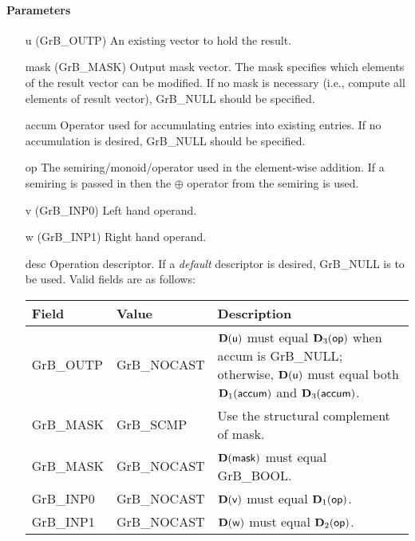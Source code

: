 \paragraph{Parameters}

\begin{itemize}[leftmargin=1.1in]
    \item[{\sf u}]     ({\sf GrB\_OUTP}) An existing vector to hold the result.

    \item[{\sf mask}] ({\sf GrB\_MASK}) Output mask vector. The mask
    specifies which elements of the result vector can be modified.
    If no mask is necessary (i.e., compute all elements of result
    vector), {\sf GrB\_NULL} should be specified.

    \item[{\sf accum}]  Operator used for accumulating entries into existing
                         entries. If no accumulation is desired,
                        {\sf GrB\_NULL} should be specified.

    \item[{\sf op}]    The semiring/monoid/operator used in the element-wise addition.
                       If a semiring is passed in then the $\oplus$  operator from
                                    the semiring is used.
    \item[{\sf v}]     ({\sf GrB\_INP0}) Left hand operand.
    \item[{\sf w}]     ({\sf GrB\_INP1}) Right hand operand.

    \item[{\sf desc}]  Operation descriptor. If a
    \emph{default} descriptor is desired, {\sf GrB\_NULL} is to be
    used. Valid fields are as follows: \\
    \begin{tabular}{llp{3in}}
        Field  & Value & Description \\
        \hline
        {\sf GrB\_OUTP} & {\sf GrB\_NOCAST} & $\bold{D}({\sf u})$ must equal $\bold{D}_3({\sf op})$
                                              when {\sf accum} is {\sf GrB\_NULL}; otherwise, 
                                              $\bold{D}({\sf u})$ must equal both 
                                              $\bold{D}_1({\sf accum})$ and $\bold{D}_3({\sf accum})$. \\
        {\sf GrB\_MASK} & {\sf GrB\_SCMP}   & Use the structural complement of {\sf mask}. \\
        {\sf GrB\_MASK} & {\sf GrB\_NOCAST} & $\bold{D}({\sf mask})$ must equal {\sf GrB\_BOOL}. \\
        {\sf GrB\_INP0} & {\sf GrB\_NOCAST} & $\bold{D}({\sf v})$ must equal $\bold{D}_1({\sf op})$. \\
        {\sf GrB\_INP1} & {\sf GrB\_NOCAST} & $\bold{D}({\sf w})$ must equal $\bold{D}_2({\sf op})$. \\
    \end{tabular}
\end{itemize}

